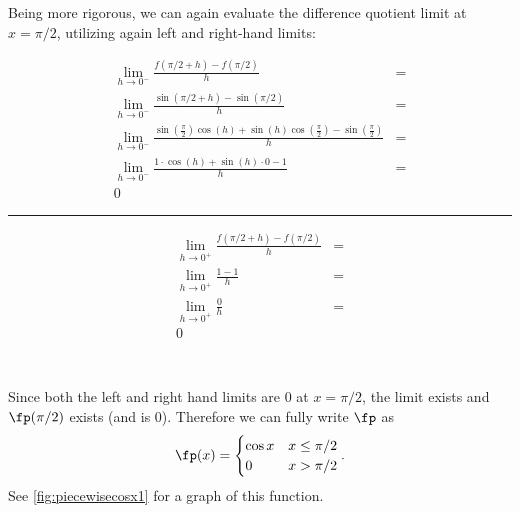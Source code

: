 \begin{example}
Being more rigorous, we can again evaluate the difference quotient limit at $x=\pi/2$, utilizing again left and right-hand limits:\\
{\small{}
\noindent\begin{minipage}{.59\linewidth}
\begin{align*}
\lim_{h\to0^-}\frac{f(\pi/2+h)-f(\pi/2)}{h} &=\\
\lim_{h\to0^-}\frac{\sin(\pi/2+h)-\sin(\pi/2)}{h}&=\\
\lim_{h\to0^-}{ \frac{\sin(\frac{\pi}{2})\cos(h)+\sin(h)\cos(\frac{\pi}{2})-\sin(\frac{\pi}{2})}{h}}&=\\
\lim_{h\to0^-}\frac{1\cdot\cos(h)+\sin(h)\cdot 0-1}{h} &=\\
0
\end{align*}
\end{minipage}%
\begin{minipage}{1pt}
 \rule{.5pt}{100pt}%
\end{minipage}%
\begin{minipage}{.39\linewidth}
\begin{align*}
\lim_{h\to0^+}\frac{f(\pi/2+h)-f(\pi/2)}{h} &=\\
\lim_{h\to0^+}\frac{1-1}{h}&=\\
\lim_{h\to0^+}\frac{0}{h}&=\\
0&\\
\phantom{0}\\
\phantom{0}
\end{align*}
\end{minipage}
}


Since both the left and right hand limits are 0 at $x=\pi/2$, the limit exists and $\fp(\pi/2)$ exists (and is 0). Therefore we can fully write $\fp$ as
\[\fp(x) = \begin{cases}\cos x & x\leq\pi/2\\ 0 & x>\pi/2\end{cases}.\]
See \autoref{fig:piecewisecosx1} for a graph of this function.
\end{example}

